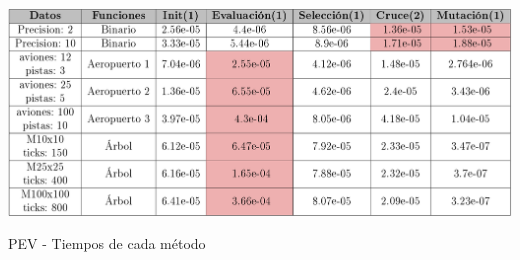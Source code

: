 		
		
		\begin{table}[!h]
			\centering
			\includegraphics[width=1\textwidth]{images/chapter_4/tabla_pev}		
			\caption{PEV - Tiempos de cada método}
			\label{tab:pev}
		\end{table}
		

		
